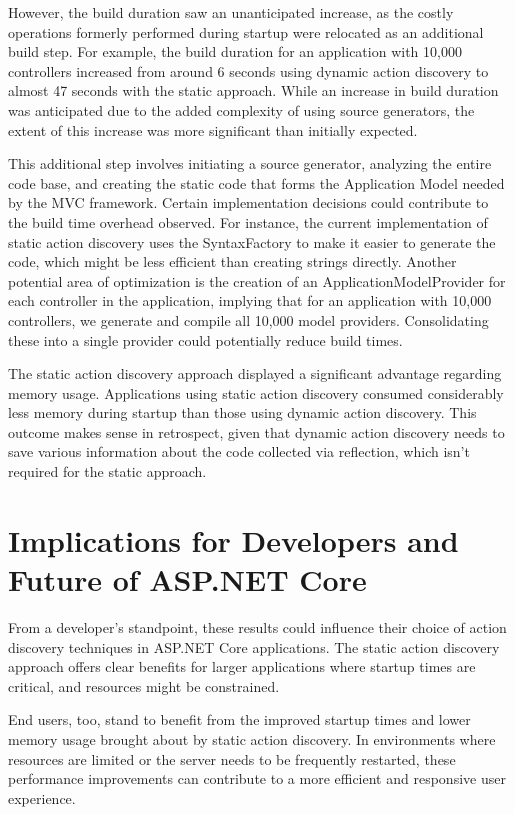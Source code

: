 However, the build duration saw an unanticipated increase, as the costly operations formerly performed during startup were relocated as an additional build step. For example, the build duration for an application with 10,000 controllers increased from around 6 seconds using dynamic action discovery to almost 47 seconds with the static approach. While an increase in build duration was anticipated due to the added complexity of using source generators, the extent of this increase was more significant than initially expected.

This additional step involves initiating a source generator, analyzing the entire code base, and creating the static code that forms the Application Model needed by the MVC framework. Certain implementation decisions could contribute to the build time overhead observed. For instance, the current implementation of static action discovery uses the SyntaxFactory to make it easier to generate the code, which might be less efficient than creating strings directly. Another potential area of optimization is the creation of an ApplicationModelProvider for each controller in the application, implying that for an application with 10,000 controllers, we generate and compile all 10,000 model providers. Consolidating these into a single provider could potentially reduce build times.

The static action discovery approach displayed a significant advantage regarding memory usage. Applications using static action discovery consumed considerably less memory during startup than those using dynamic action discovery. This outcome makes sense in retrospect, given that dynamic action discovery needs to save various information about the code collected via reflection, which isn't required for the static approach.

\section{Implications for Developers and Future of ASP.NET Core}

From a developer's standpoint, these results could influence their choice of action discovery techniques in ASP.NET Core applications. The static action discovery approach offers clear benefits for larger applications where startup times are critical, and resources might be constrained.

End users, too, stand to benefit from the improved startup times and lower memory usage brought about by static action discovery. In environments where resources are limited or the server needs to be frequently restarted, these performance improvements can contribute to a more efficient and responsive user experience.

